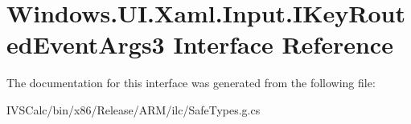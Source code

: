 \hypertarget{interface_windows_1_1_u_i_1_1_xaml_1_1_input_1_1_i_key_routed_event_args3}{}\section{Windows.\+U\+I.\+Xaml.\+Input.\+I\+Key\+Routed\+Event\+Args3 Interface Reference}
\label{interface_windows_1_1_u_i_1_1_xaml_1_1_input_1_1_i_key_routed_event_args3}


The documentation for this interface was generated from the following file\+:\begin{DoxyCompactItemize}
\item 
I\+V\+S\+Calc/bin/x86/\+Release/\+A\+R\+M/ilc/Safe\+Types.\+g.\+cs\end{DoxyCompactItemize}
